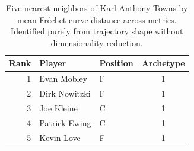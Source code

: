 \begin{table}[htbp]
  \centering\small
  \begin{tabular}{rllc}
    \toprule
    Rank & Player & Position & Archetype \\
    \midrule
    1 & Evan Mobley & F & 1 \\
    2 & Dirk Nowitzki & F & 1 \\
    3 & Joe Kleine & C & 1 \\
    4 & Patrick Ewing & C & 1 \\
    5 & Kevin Love & F & 1 \\
    \bottomrule
  \end{tabular}
  \caption{Five nearest neighbors of Karl-Anthony Towns by mean Fr\'{e}chet curve distance across metrics. Identified purely from trajectory shape without dimensionality reduction.}
  \label{tab:Karl_Anthony_Towns_frechet_curve_neighbors}
\end{table}

